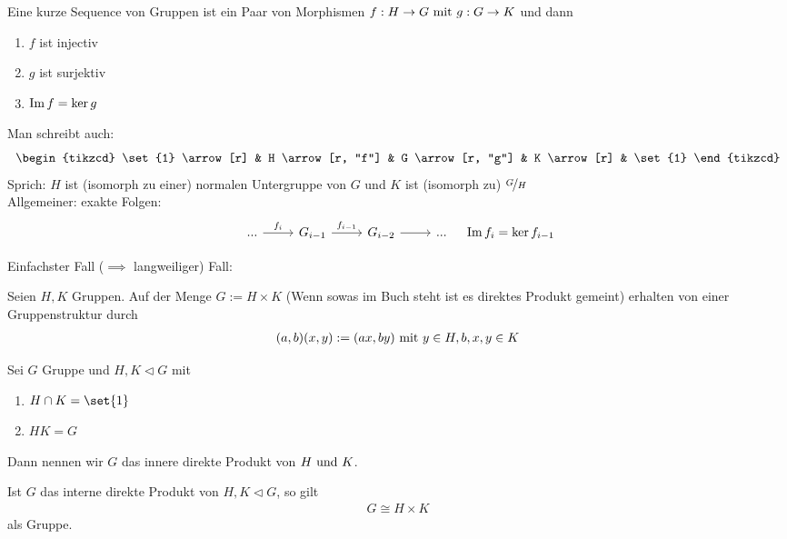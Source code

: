 \begin{definition}
	Eine kurze Sequence von Gruppen ist ein Paar von Morphismen $f: H \to G \mit g: G \to K$ und dann
	\begin{enumerate}
		\item $f$ ist injectiv
		\item $g$ ist surjektiv
		\item $\Image f = \ker g$
	\end{enumerate}
	Man schreibt auch:
		\[
			\begin{tikzcd}
			\set{1} \arrow[r] & H \arrow[r, "f"] & G \arrow[r, "g"] & K \arrow[r] & \set{1}
			\end{tikzcd}
		\]
		Sprich: $H$ ist (isomorph zu einer) normalen Untergruppe von $G$ und $K$ ist (isomorph zu) $\lnkset{G}{H}$\\
		Allgemeiner: exakte Folgen:\\
		\[
			\begin{tikzcd}
			... \arrow[r, "f_i"] & G_{i-1} \arrow[r, "f_{i-1}"] & G_{i-2} \arrow[r] & ...
			\end{tikzcd} \quad \Image f_i = \ker f_{i-1}
		\]
\end{definition}
Einfachster Fall ($\implies$ langweiliger) Fall: 
\begin{definition}
	Seien $H,K$ Gruppen. Auf der Menge $G:= H \times K$ (Wenn sowas im Buch steht ist es direktes Produkt gemeint) erhalten von einer Gruppenstruktur durch
	\begin{align*}
		(a,b)(x,y) := (ax,by) \mit y \in H,b,x,y \in K
	\end{align*}
\end{definition}
\begin{definition}
	Sei $G$ Gruppe und $H,K \lhd G$ mit
	\begin{enumerate}
		\item $H \cap K = \set{1}$ %
		\item $HK = G$
	\end{enumerate}
	Dann nennen wir $G$ das innere direkte Produkt von $H \und K$.
\end{definition}
\begin{proposition}
	Ist $G$ das interne direkte Produkt von $H,K \lhd G$, so gilt 
	\begin{align*}
		G \cong H \times K
	\end{align*}
	als Gruppe.
\end{proposition}
